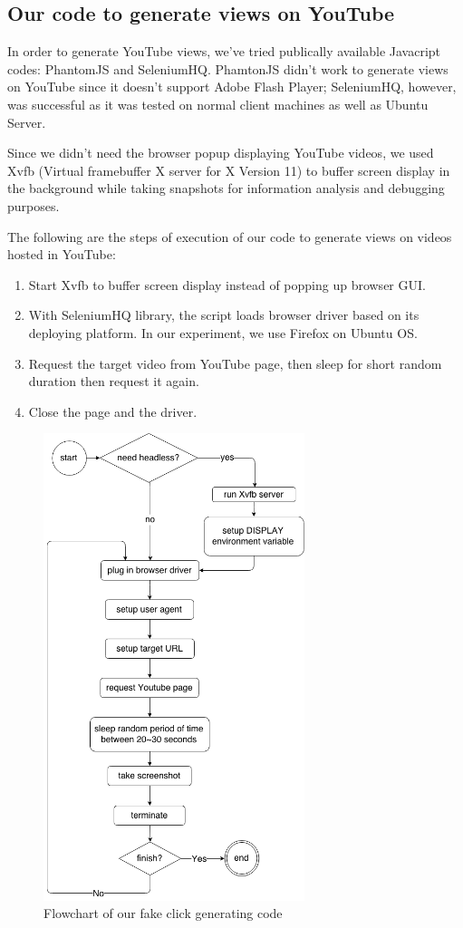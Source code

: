 \documentclass[conference]{IEEEtran}
\begin{document}
\subsection{Our code to generate views on YouTube}

In order to generate YouTube views, we've tried publically available Javacript codes: PhantomJS and SeleniumHQ. PhamtonJS didn’t work to generate views on YouTube since it doesn’t support Adobe Flash Player; SeleniumHQ, however, was successful as it was tested on normal client machines as well as Ubuntu Server.

Since we didn’t need the browser popup displaying YouTube videos, we used Xvfb (Virtual framebuffer X server for X Version 11) to buffer screen display in the background while taking snapshots for information analysis and debugging purposes.

The following are the steps of execution of our code to generate views on videos hosted in YouTube:

\begin{enumerate}
  \item Start Xvfb to buffer screen display instead of popping up browser GUI.
  \item With SeleniumHQ library, the script loads browser driver based on its deploying platform. In our experiment, we use Firefox on Ubuntu OS.
  \item Request the target video from YouTube page, then sleep for short random duration then request it again.
  \item Close the page and the driver.
\end{enumerate}

\begin{figure}
  \centering
  \includegraphics[width=3.0in]{flowchart}
  \caption{Flowchart of our fake click generating code}
\end{figure}
\end{document}
